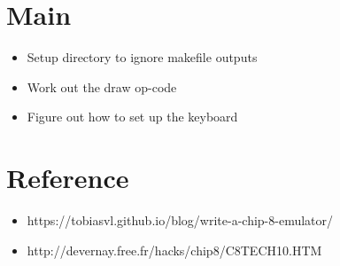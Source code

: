 \documentclass{article}
\begin{document}
\section*{Main}
\begin{itemize}
	\item Setup directory to ignore makefile outputs
	\item Work out the draw op-code
	\item Figure out how to set up the keyboard
\end{itemize}

\section*{Reference}
\begin{itemize}
	\item https://tobiasvl.github.io/blog/write-a-chip-8-emulator/
	\item http://devernay.free.fr/hacks/chip8/C8TECH10.HTM
\end{itemize}
\end{document}

